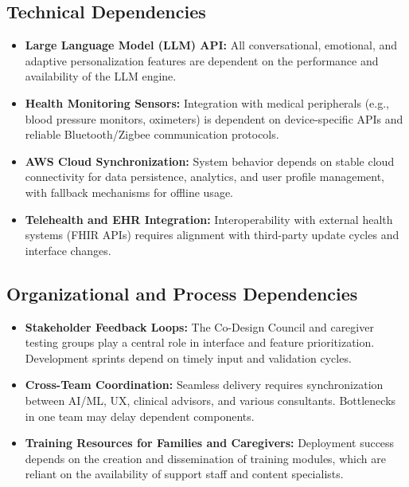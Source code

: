 \documentclass[
  letterpaper,
  DIV=11,
  numbers=noendperiod]{scrartcl}
\providecommand{\tightlist}{%
  \setlength{\itemsep}{0pt}\setlength{\parskip}{0pt}}\usepackage{longtable,booktabs,array}
\begin{document}
\subsection{Technical Dependencies}\label{technical-dependencies}

\begin{itemize}
\tightlist
\item
  \textbf{Large Language Model (LLM) API:} All conversational,
  emotional, and adaptive personalization features are dependent on the
  performance and availability of the LLM engine.
\item
  \textbf{Health Monitoring Sensors:} Integration with medical
  peripherals (e.g., blood pressure monitors, oximeters) is dependent on
  device-specific APIs and reliable Bluetooth/Zigbee communication
  protocols.
\item
  \textbf{AWS Cloud Synchronization:} System behavior depends on stable
  cloud connectivity for data persistence, analytics, and user profile
  management, with fallback mechanisms for offline usage.
\item
  \textbf{Telehealth and EHR Integration:} Interoperability with
  external health systems (FHIR APIs) requires alignment with
  third-party update cycles and interface changes.
\end{itemize}

\subsection{Organizational and Process
Dependencies}\label{organizational-and-process-dependencies}

\begin{itemize}
\tightlist
\item
  \textbf{Stakeholder Feedback Loops:} The Co-Design Council and
  caregiver testing groups play a central role in interface and feature
  prioritization. Development sprints depend on timely input and
  validation cycles.
\item
  \textbf{Cross-Team Coordination:} Seamless delivery requires
  synchronization between AI/ML, UX, clinical advisors, and various
  consultants. Bottlenecks in one team may delay dependent components.
\item
  \textbf{Training Resources for Families and Caregivers:} Deployment
  success depends on the creation and dissemination of training modules,
  which are reliant on the availability of support staff and content
  specialists.
\end{itemize}
\end{document}
